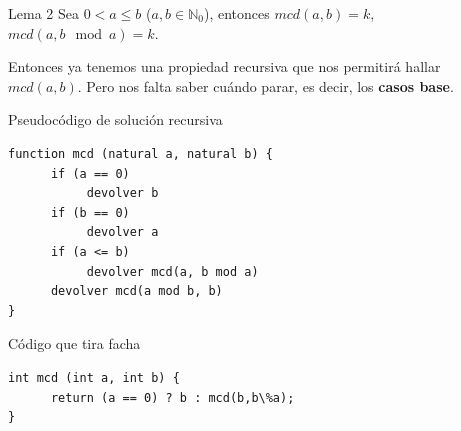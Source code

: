 \documentclass[compress]{beamer}
\begin{document}
\begin{frame}
\begin{block}{Lema 2}
	Sea $0 < a \leq b$ ($a, b \in \mathbb{N}_0$), entonces $mcd(a, b) = k$, $mcd(a, b \mod{a}) = k$.
\end{block}
\pause
{}
\end{frame}

\begin{frame}
Entonces ya tenemos una propiedad recursiva que nos permitir\'a hallar $mcd(a,b)$. Pero nos falta saber cu\'ando parar, es decir, los \textbf{casos base}. \\ \bigskip
\pause
{}
\end{frame}

\begin{frame}[fragile]{Pseudoc\'odigo de soluci\'on recursiva}
\begin{verbatim}
function mcd (natural a, natural b) {
      if (a == 0)
           devolver b
      if (b == 0)
           devolver a
      if (a <= b)
           devolver mcd(a, b mod a)
      devolver mcd(a mod b, b)
}
\end{verbatim}
\end{frame}

\begin{frame}[fragile]{C\'odigo que tira facha}
\begin{verbatim}
int mcd (int a, int b) {
      return (a == 0) ? b : mcd(b,b\%a);
}
\end{verbatim}
\end{frame}
\end{document}
